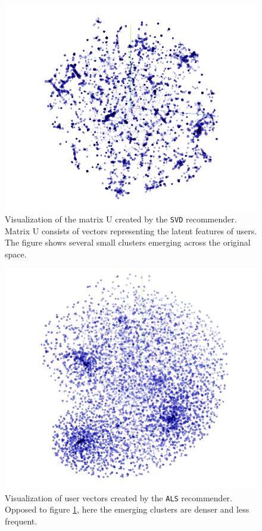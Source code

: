 \begin{figure}[H]
    \centering
    \includegraphics[scale=0.43]{obrazky-figures/svd_uid.png}
    \caption{Visualization of the matrix U created by the \texttt{SVD} recommender. Matrix U consists of vectors representing the latent features of users. The figure shows several small clusters emerging across the original space.}
    \label{ap:svd_u}
\end{figure}

\begin{figure}[H]
    \centering
    \includegraphics[scale=0.43]{obrazky-figures/als2.png}
    \caption{Visualization of user vectors created by the \texttt{ALS} recommender. Opposed to figure \ref{ap:svd_u}, here the emerging clusters are denser and less frequent.}
\end{figure}


